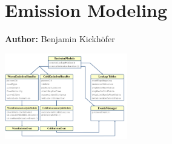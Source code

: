 \chapter{Emission Modeling}
\label{ch:emissions}

\hfill \textbf{Author:} Benjamin Kickhöfer

\begin{center} \includegraphics[width=0.4\textwidth, angle=0]{extending/figures/emissionToolOverview_pdfa.pdf} \end{center}

